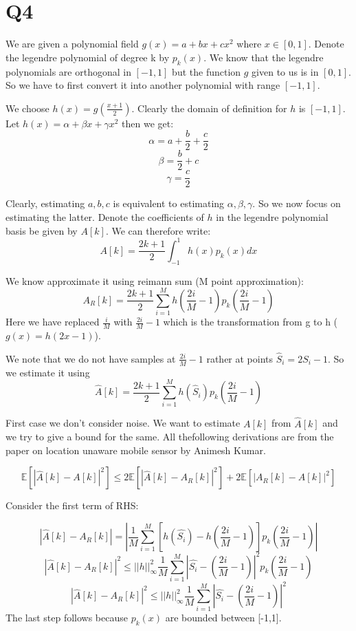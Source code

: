 \documentclass{article}
\begin{document}
\section*{Q4}
We are given a polynomial field $g(x) = a + bx + cx^2$ where $x \in [0, 1]$. Denote the legendre polynomial of degree k by $p_k(x)$. We know that the legendre polynomials are orthogonal in $[-1, 1]$ but the function $g$ given to  us is in $[0, 1]$. So we have to first convert it into another polynomial with range $[-1, 1]$.

We choose $h(x) = g(\frac{x+1}{2})$. Clearly the domain of definition for $h$ is $[-1, 1]$. Let $h(x) = \alpha + \beta x + \gamma x^2$ then we get:
$$\alpha = a + \frac{b}{2} + \frac{c}{2}$$
$$\beta = \frac{b}{2} + c$$
$$\gamma = \frac{c}{2}$$

Clearly, estimating $a, b, c$ is equivalent to estimating $\alpha, \beta, \gamma$. So we now focus on estimating the latter. Denote the coefficients of $h$ in the legendre polynomial basis be given by $A[k]$. We can therefore write:
$$A[k] = \frac{2k+1}{2} \int_{-1}^1 h(x) p_k(x) dx$$

We know approximate it using reimann sum (M point approximation):
$$A_R[k] = \frac{2k+1}{2} \sum_{i=1}^M h(\frac{2i}{M}-1) p_k(\frac{2i}{M} -1)$$
Here we have replaced $\frac{i}{M}$ with $\frac{2i}{M}-1$ which is the transformation from g to h ($g(x) = h(2x-1)$).

We note that we do not have samples at $\frac{2i}{M} -1$ rather at points $\hat{S}_i = 2 S_i - 1$. So we estimate it using
$$\hat{A}[k] = \frac{2k+1}{2} \sum_{i=1}^M h(\hat{S}_i) p_k(\frac{2i}{M} -1)$$

First case we don't consider noise. We want to estimate $A[k]$ from $\hat{A}[k]$ and we try to give a bound for the same. All thefollowing derivations are from the paper on location unaware mobile sensor by Animesh Kumar.

$$\mathbb{E}[|\hat{A}[k] - A[k]|^2] \le 2 \mathbb{E}[|\hat{A}[k] - A_R[k]|^2] + 2 \mathbb{E}[|A_R[k] - A[k]|^2]$$

Consider the first term of RHS:

$$|\hat{A}[k] - A_R[k]| = |\frac{1}{M}\sum_{i=1}^M[h(\hat{S_i}) - h(\frac{2i}{M} -1)]p_k(\frac{2i}{M} -1)|$$
$$|\hat{A}[k] - A_R[k]|^2 \le ||h||_{\infty}^2 \frac{1}{M}\sum_{i=1}^M |\hat{S_i} - (\frac{2i}{M} -1)|^2 p_k(\frac{2i}{M}-1)$$
$$|\hat{A}[k] - A_R[k]|^2 \le ||h||_{\infty}^2 \frac{1}{M}\sum_{i=1}^M |\hat{S_i} - (\frac{2i}{M} -1)|^2$$
The last step follows because $p_k(x)$ are bounded between [-1,1].
\end{document}
